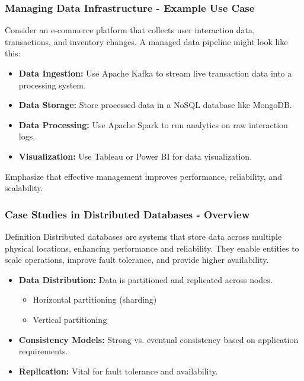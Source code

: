 \documentclass[aspectratio=169]{beamer}
\begin{document}
\begin{frame}[fragile]
    \frametitle{Managing Data Infrastructure - Example Use Case}
    Consider an e-commerce platform that collects user interaction data, transactions, and inventory changes. A managed data pipeline might look like this:

    \begin{itemize}
        \item \textbf{Data Ingestion:} Use Apache Kafka to stream live transaction data into a processing system.
        \item \textbf{Data Storage:} Store processed data in a NoSQL database like MongoDB.
        \item \textbf{Data Processing:} Use Apache Spark to run analytics on raw interaction logs.
        \item \textbf{Visualization:} Use Tableau or Power BI for data visualization.
    \end{itemize}

    Emphasize that effective management improves performance, reliability, and scalability.
\end{frame}

\begin{frame}[fragile]
    \frametitle{Case Studies in Distributed Databases - Overview}
    \begin{block}{Definition}
        Distributed databases are systems that store data across multiple physical locations, enhancing performance and reliability.
        They enable entities to scale operations, improve fault tolerance, and provide higher availability.
    \end{block}

    \begin{itemize}
        \item \textbf{Data Distribution:} Data is partitioned and replicated across nodes.
        \begin{itemize}
            \item Horizontal partitioning (sharding)
            \item Vertical partitioning
        \end{itemize}
        \item \textbf{Consistency Models:} Strong vs. eventual consistency based on application requirements.
        \item \textbf{Replication:} Vital for fault tolerance and availability.
    \end{itemize}
\end{frame}
\end{document}
